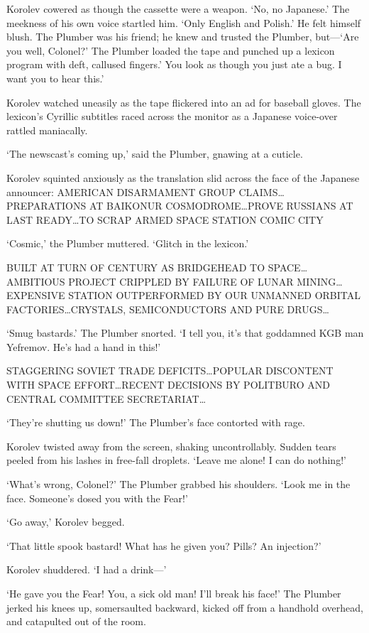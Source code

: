 Korolev cowered as though the cassette were a weapon. `No, no Japanese.' The meekness of his own voice startled him. `Only English and Polish.' He felt himself blush. The Plumber was his friend; he knew and trusted the Plumber, but---`Are you well, Colonel?' The Plumber loaded the tape and punched up a lexicon program with deft, callused fingers.' You look as though you just ate a bug. I want you to hear this.'

Korolev watched uneasily as the tape flickered into an ad for baseball gloves. The lexicon's Cyrillic subtitles raced across the monitor as a Japanese voice-over rattled maniacally.

`The newscast's coming up,' said the Plumber, gnawing at a cuticle.

Korolev squinted anxiously as the translation slid across the face of the Japanese announcer: AMERICAN DISARMAMENT GROUP CLAIMS\ldots PREPARATIONS AT BAIKONUR COSMODROME\ldots PROVE RUSSIANS AT LAST READY\ldots TO SCRAP ARMED SPACE STATION COMIC CITY

`Cosmic,' the Plumber muttered. `Glitch in the lexicon.'

BUILT AT TURN OF CENTURY AS BRIDGEHEAD TO SPACE\ldots AMBITIOUS PROJECT CRIPPLED BY FAILURE OF LUNAR MINING\ldots EXPENSIVE STATION OUTPERFORMED BY OUR UNMANNED ORBITAL FACTORIES\ldots CRYSTALS, SEMICONDUCTORS AND PURE DRUGS\ldots

`Smug bastards.' The Plumber snorted. `I tell you, it's that goddamned KGB man Yefremov. He's had a hand in this!'

STAGGERING SOVIET TRADE DEFICITS\ldots POPULAR DISCONTENT WITH SPACE EFFORT\ldots RECENT DECISIONS BY POLITBURO AND CENTRAL COMMITTEE SECRETARIAT\ldots

`They're shutting us down!' The Plumber's face contorted with rage.

Korolev twisted away from the screen, shaking uncontrollably. Sudden tears peeled from his lashes in free-fall droplets. `Leave me alone! I can do nothing!'

`What's wrong, Colonel?' The Plumber grabbed his shoulders. `Look me in the face. Someone's dosed you with the Fear!'

`Go away,' Korolev begged.

`That little spook bastard! What has he given you? Pills? An injection?'

Korolev shuddered. `I had a drink---'

`He gave you the Fear! You, a sick old man! I'll break his face!' The Plumber jerked his knees up, somersaulted backward, kicked off from a handhold overhead, and catapulted out of the room.

